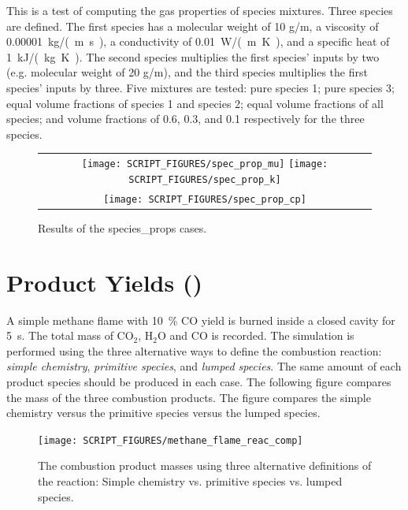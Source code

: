 \documentclass[11pt]{book}
\begin{document}
This is a test of computing the gas properties of species mixtures. Three species are defined. The first species has a molecular weight of 10 g/m, a viscosity of 0.00001~\si{kg/(m.s)},
a conductivity of 0.01~\si{W/(m.K)}, and a specific heat of 1~\si{kJ/(kg.K)}. The second species multiplies the first species' inputs by two (e.g. molecular weight of 20 g/m), and the third species multiplies the first species' inputs by three. Five mixtures are tested: pure species 1; pure species 3; equal volume fractions of species 1 and species 2; equal volume fractions of all species; and volume fractions of 0.6, 0.3, and 0.1 respectively for the three species.

\begin{figure}[ht]
	\centering
	\begin{tabular}{c}
      \texttt{[image: SCRIPT\_FIGURES/spec\_prop\_mu]}
      \texttt{[image: SCRIPT\_FIGURES/spec\_prop\_k]} \\
      \texttt{[image: SCRIPT\_FIGURES/spec\_prop\_cp]}
   \end{tabular}
   \caption[Results of the {\ct species\_props} cases]{Results of the {\ct species\_props} cases.}
   \label{fig_species_props}
\end{figure}

\section{Product Yields (\texorpdfstring{}{methane\_flame})}
\label{methane_flame}

A simple methane flame with 10~\% CO yield is burned inside a closed cavity for 5~s.
The total mass of CO$_2$, H$_2$O and CO is recorded.
The simulation is performed using the three alternative ways
to define the combustion reaction: {\em simple chemistry}, {\em primitive species}, and {\em lumped species}. The
same amount of each product species should be produced in each case. The following figure compares the
mass of the three combustion products. The figure compares the simple chemistry versus the primitive species versus the lumped species.
\begin{figure}[ht]
\centering
\texttt{[image: SCRIPT\_FIGURES/methane\_flame\_reac\_comp]}
\caption[Yield of combustion products for alternative reactions]{The combustion product masses using three alternative definitions of the reaction:  Simple chemistry vs. primitive species vs. lumped species. }
\label{fig_methane_flame_yields}
\end{figure}
\end{document}
